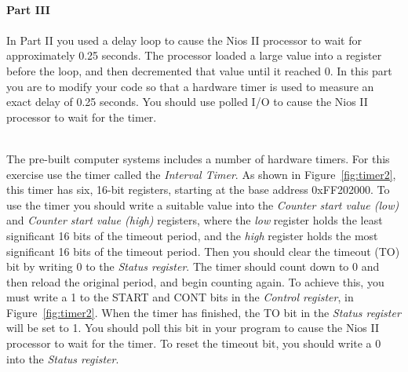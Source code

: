 \documentclass[epsfig,10pt,fullpage]{article}
\begin{document}
~\\
\noindent
{\bf Part III}
~\\
~\\
\noindent
In Part II you used a delay loop to cause the Nios II processor to wait for approximately 0.25 
seconds. The processor loaded a large value into a register before the loop, and then 
decremented that value until it reached 0.  In this part you are to modify your code so that a
hardware timer is used to measure an exact delay of 0.25 seconds. You should use polled I/O to
cause the Nios II processor to wait for the timer.

~\\
\noindent
The pre-built computer systems includes a number of hardware timers. For this exercise use the timer
called the {\it Interval Timer}. As shown in Figure~\ref{fig:timer2}, this timer has 
six, 16-bit registers, starting at the base address {\sf 0xFF202000}. 
To use the timer you should
write a suitable value into the {\it Counter start value (low)} and {\it Counter start value (high)} 
registers, where the {\it low} register holds the least significant 16 bits of the timeout
period, and the {\it high} register holds the most significant 16 bits of the timeout period. Then you should clear the 
timeout (TO) bit by writing 0 to the {\it Status register}. The timer should count down
to 0 and then reload the original period, and begin counting again. To achieve this, you must write a 1 to the START and CONT
bits in the {\it Control register}, in Figure~\ref{fig:timer2}. When the timer has finished, the TO bit in
the {\it Status register} will be set to 1. You should poll this bit in your program to cause the Nios II
processor to wait for the timer. To reset the timeout bit, you should write a 0 into the {\it Status register}.
\end{document}
